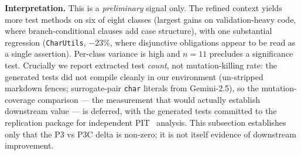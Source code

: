 \textbf{Interpretation.} This is a \emph{preliminary} signal only. The
refined context yields more test methods on six of eight classes
(largest gains on validation-heavy code, where branch-conditional
clauses add case structure), with one substantial regression
(\texttt{CharUtils}, $-23\%$, where disjunctive obligations appear to
be read as a single assertion). Per-class variance is high and
$n{=}11$ precludes a significance test. Crucially we report extracted
test \emph{count}, not mutation-killing rate: the generated tests did
not compile cleanly in our environment (un-stripped markdown fences;
surrogate-pair \texttt{char} literals from Gemini-2.5), so the
mutation-coverage comparison --- the measurement that would actually
establish downstream value --- is deferred, with the generated tests
committed to the replication package for independent
PIT~\cite{coles2016pitest} analysis. This subsection establishes only
that the P3 vs P3C delta is non-zero; it is not itself evidence of
downstream improvement.
